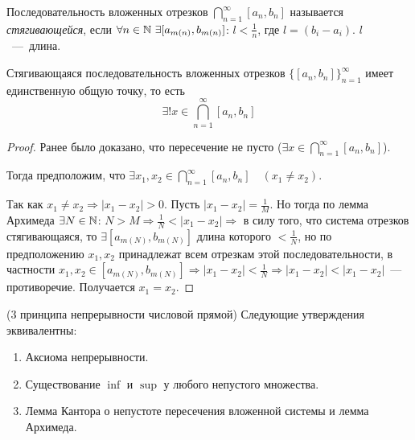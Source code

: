     \begin{definition}
        Последовательность вложенных отрезков $\displaystyle \bigcap_{n = 1}^{\infty} [a_{n}, b_{n}]$ называется \newline \textit{стягивающейся}, если $\forall n \in \mathbb{N} \  \exists [a_{m(n)}, b_{m(n)}]$: $l \displaystyle < \frac{1}{n}$, где $l = (b_{i} - a_{i})$. $l$~---~длина.
    \end{definition}
    \begin{theorem}
        Стягивающаяся последовательность вложенных отрезков $\{ [a_{n}, b_{n}] \}^{\infty}_{n = 1}$ имеет единственную общую точку, то есть
        $$ \exists ! x \in \bigcap_{n = 1}^{\infty} [a_{n}, b_{n}]$$
    \end{theorem}
    \begin{proof}
        Ранее было доказано, что пересечение не пусто \bigg($\displaystyle \exists x \in \bigcap_{n = 1}^{\infty} [a_{n}, b_{n}]$\bigg).

        Тогда предположим, что $\displaystyle \exists x_{1}, x_{2} \in \bigcap_{n = 1}^{\infty} [a_{n}, b_{n}] \quad (x_{1} \neq x_{2}).$

        Так как $x_{1} \neq x_{2} \Rightarrow |x_{1} - x_{2}| > 0.$ Пусть $\displaystyle |x_{1} - x_{2}| = \frac{1}{M}.$ Но тогда по лемма Архимеда $\displaystyle \exists N \in \mathbb{N}$: $\displaystyle N > M \Rightarrow \frac{1}{N} < |x_{1} - x_{2}| \Rightarrow$ в силу того, что система отрезков стягивающаяся, то $\exists [a_{m(N)}, b_{m(N)}]$ длина которого $\displaystyle < \frac{1}{N}$, но по предположению $x_{1}, x_{2}$ принадлежат всем отрезкам этой последовательности, в частности $\displaystyle x_{1}, x_{2} \in [a_{m(N)}, b_{m(N)}] \Rightarrow |x_{1} - x_{2}| < \frac{1}{N} \Rightarrow |x_{1} - x_{2}| < |x_{1} - x_{2}|$~---~ противоречие. Получается $x_{1} = x_{2}.$
    \end{proof}
    \begin{theorem}
        (3 принципа непрерывности числовой прямой) Следующие утверждения эквивалентны:
        \begin{enumerate}
            \item Аксиома непрерывности.
            \item Существование $\inf$ и $\sup$ у любого непустого множества.
            \item Лемма Кантора о непустоте пересечения вложенной системы и лемма Архимеда.
        \end{enumerate}
    \end{theorem}